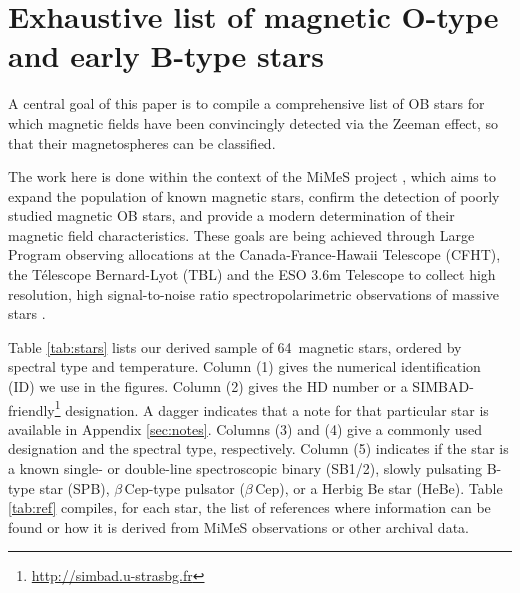 \documentclass[useAMS,usenatbib]{mn2e}
\newcommand{\nstars}{64}
\begin{document}
\section{Exhaustive list of magnetic O-type and early B-type stars}
\label{sec:stars}

A central goal of this paper is to compile a comprehensive list of OB stars for which magnetic fields have been convincingly detected via the Zeeman effect, so that their magnetospheres can be classified. 

The work here is done within the context of the MiMeS project \citep{2010arXiv1009.3563W}, which aims to expand the population of known magnetic stars, confirm the detection of poorly studied magnetic OB stars, and provide a modern determination of their magnetic field characteristics. These goals are being achieved through Large Program observing allocations at the Canada-France-Hawaii Telescope (CFHT), the T\'elescope Bernard-Lyot (TBL) and the ESO 3.6m Telescope to collect high resolution, high signal-to-noise ratio spectropolarimetric observations of massive stars \citep[see][respectively]{2010arXiv1009.3563W,2012MNRAS.419..959O,2011A&A...536L...6A}.

Table \ref{tab:stars} lists our derived sample of \nstars\ magnetic stars, ordered by spectral type and temperature. Column (1) gives the numerical identification (ID) we use in the figures. Column (2) gives the HD number or a SIMBAD-friendly\footnote{\href{http://simbad.u-strasbg.fr}{http://simbad.u-strasbg.fr}} designation. A dagger indicates that a note for that particular star is available in Appendix \ref{sec:notes}. Columns (3) and (4) give a commonly used designation and the spectral type, respectively. Column (5) indicates if the star is a known single- or double-line spectroscopic binary (SB1/2), slowly pulsating B-type star (SPB), $\beta$\,Cep-type pulsator ($\beta$\,Cep), or a Herbig Be star (HeBe). 
Table \ref{tab:ref} compiles, for each star, the list of references where information can be found or how it is derived from MiMeS observations or other archival data.


%		
\clearpage
\onecolumn
\begin{landscape}
	{\small }
\end{landscape}
\twocolumn
\end{document}
